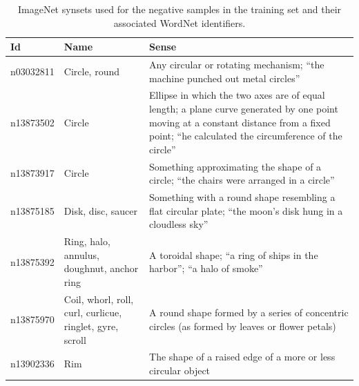 \documentclass{sig-alternate-05-2015}
\begin{document}
{{      \begin{table}
        \centering
        \caption{ImageNet synsets used for the negative samples in the training set and their associated WordNet identifiers.}
				\label{tab:negative_samples}
        \begin{tabularx}{\textwidth}{@{}lp{4cm}X@{}}
          \toprule
          \textbf{Id} & \textbf{Name} & \textbf{Sense} \\
          \midrule
            n03032811 & Circle, round & Any circular or rotating mechanism; ``the machine punched out metal circles'' \\
            n13873502 & Circle & Ellipse in which the two axes are of equal length; a plane curve generated by one point moving at a constant distance from a fixed point; ``he calculated the circumference of the circle'' \\
            n13873917 & Circle & Something approximating the shape of a circle; ``the chairs were arranged in a circle'' \\
            n13875185 & Disk, disc, saucer & Something with a round shape resembling a flat circular plate; ``the moon's disk hung in a cloudless sky'' \\
            n13875392 & Ring, halo, annulus, doughnut, anchor ring & A toroidal shape; ``a ring of ships in the harbor''; ``a halo of smoke'' \\
            n13875970 & Coil, whorl, roll, curl, curlicue, ringlet, gyre, scroll & A round shape formed by a series of concentric circles (as formed by leaves or flower petals) \\
            n13902336 & Rim & The shape of a raised edge of a more or less circular object \\
          \bottomrule
        \end{tabularx}
      \end{table}

}}
\end{document}
